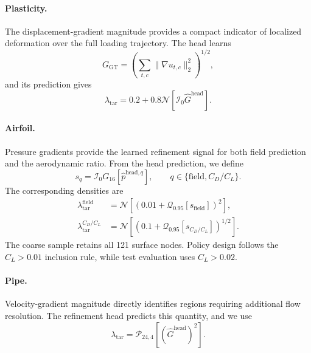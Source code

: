 \paragraph{Plasticity.}
The displacement-gradient magnitude provides a compact indicator of localized
deformation over the full loading trajectory. The head learns
\[
    G_{\mathrm{GT}}
    =
    \left(
        \sum_{t,c}\|\nabla u_{t,c}\|_2^2
    \right)^{1/2},
\]
and its prediction gives
\begin{equation}
    \lambda_{\mathrm{tar}}
    =0.2+0.8\mathcal{N}\!\left[
        \mathcal{I}_0\widehat G^{\mathrm{head}}
    \right].
    \label{eq:app_ca_plasticity_density}
\end{equation}

\paragraph{Airfoil.}
Pressure gradients provide the learned refinement signal for both field
prediction and the aerodynamic ratio. From the head prediction, we define
\[
    s_q
    =\mathcal{I}_0G_{16}
       [\widehat p^{\mathrm{head},q}],
    \qquad
    q\in\{\mathrm{field},C_D/C_L\}.
\]
The corresponding densities are
\begin{equation}
    \begin{aligned}
    \lambda_{\mathrm{tar}}^{\mathrm{field}}
       &=\mathcal{N}\!\left[
          (0.01+\mathcal{Q}_{0.95}[s_{\mathrm{field}}])^2
          \right],\\
    \lambda_{\mathrm{tar}}^{C_D/C_L}
       &=\mathcal{N}\!\left[
          (0.1+\mathcal{Q}_{0.95}[s_{C_D/C_L}])^{1/2}
          \right].
    \end{aligned}
    \label{eq:app_ca_airfoil_density}
\end{equation}
The coarse sample retains all 121 surface nodes. Policy design follows the
$C_L>0.01$ inclusion rule, while test evaluation uses $C_L>0.02$.

\paragraph{Pipe.}
Velocity-gradient magnitude directly identifies regions requiring additional
flow resolution. The refinement head predicts this quantity, and we use
\begin{equation}
    \lambda_{\mathrm{tar}}
    =\mathcal{P}_{24,4}
       [(\widehat G^{\mathrm{head}})^2].
    \label{eq:app_ca_pipe_density}
\end{equation}

